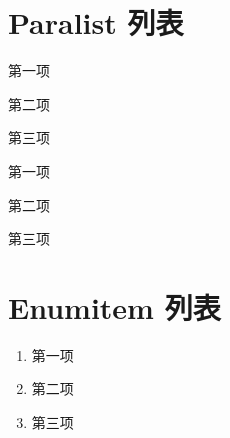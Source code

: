 \section*{Paralist 列表}
\begin{compactitem}
    \item 第一项
    \item 第二项
    \item 第三项
\end{compactitem}

\begin{compactenum}
    \item 第一项
    \item 第二项
    \item 第三项
\end{compactenum}

\section*{Enumitem 列表}
\begin{enumerate}[label=\arabic*), leftmargin=2em]
    \item 第一项
    \item 第二项
    \item 第三项
\end{enumerate}

